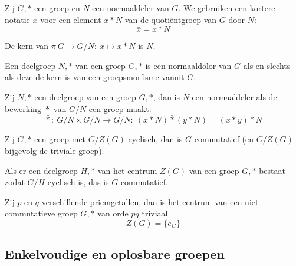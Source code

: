 \documentclass[main.tex]{subfiles}
\begin{document}
\begin{de}
  Zij $G,*$ een groep en $N$ een normaaldeler van $G$.
  We gebruiken een kortere notatie $\bar{x}$ voor een element $x*N$ van de quoti\"entgroep van $G$ door $N$:
  \[ \bar{x} = x*N \]
\end{de}

\begin{ei}
  De kern van $\pi\ G \rightarrow G/N:\ x \mapsto x*N$ is $N$.
  
\end{ei}

\begin{gev}
  Een deelgroep $N,*$ van een groep $G,*$ is een normaaldolor van $G$ als en slechts als deze de kern is van een groepsmorfisme vanuit $G$.
  
\end{gev}

\begin{st}
  Zij $N,*$ een deelgroep van een groep $G,*$, dan is $N$ een normaaldeler als de bewerking $\bar{*}$ van $G/N$ een groep maakt:
  \[ \bar{*}:\ G/N \times G/N \rightarrow G/N:\ (x*N)\bar{*}(y*N) = (x*y)*N \]
  
\end{st}

\begin{st}
  Zij $G,*$ een groep met $G/Z(G)$ cyclisch, dan is $G$ commutatief (en $G/Z(G)$ bijgevolg de triviale groep).
  
\end{st}

\begin{st}
  Als er een deelgroep $H,*$ van het centrum $Z(G)$ van een groep $G,*$ bestaat zodat $G/H$ cyclisch is, das is $G$ commutatief.
  
\end{st}

\begin{gev}
  Zij $p$ en $q$ verschillende priemgetallen, dan is het centrum van een niet-commutatieve groep $G,*$ van orde $pq$ triviaal.
  \[ Z(G) = \{ e_{G} \} \]
  
\end{gev}

\subsection{Enkelvoudige en oplosbare groepen}
\label{sec:enkelv-en-oplosb}
\end{document}
